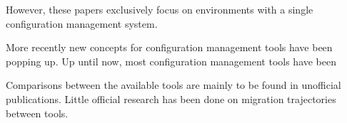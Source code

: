 However, these papers exclusively focus on environments with a single configuration management system. 

More recently new concepts for configuration management tools have been popping up. Up until now, most configuration management tools have been 

Comparisons between the available tools are mainly to be found in unofficial publications. Little official research has been done on migration trajectories between tools. 
\cite{Hardion2013}
\cite{Collar2015}

